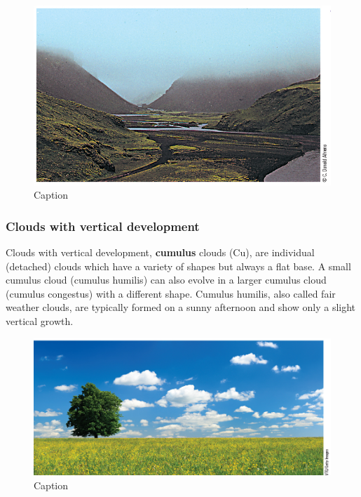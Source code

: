 \documentclass[12pt,oneside]{book}
\begin{document}
\begin{figure}

{\centering \includegraphics[width=0.8\linewidth]{figures/Figure253} 

}

\caption{Caption}\label{fig:CLOUD8}
\end{figure}

\subsubsection{Clouds with vertical
development}\label{clouds-with-vertical-development}

Clouds with vertical development, \textbf{cumulus} clouds (Cu), are
individual (detached) clouds which have a variety of shapes but always a
flat base. A small cumulus cloud (cumulus humilis) can also evolve in a
larger cumulus cloud (cumulus congestus) with a different shape. Cumulus
humilis, also called fair weather clouds, are typically formed on a
sunny afternoon and show only a slight vertical growth.

\begin{figure}

{\centering \includegraphics[width=1\linewidth]{figures/Figure254} 

}

\caption{Caption}\label{fig:CLOUD9}
\end{figure}
\end{document}
